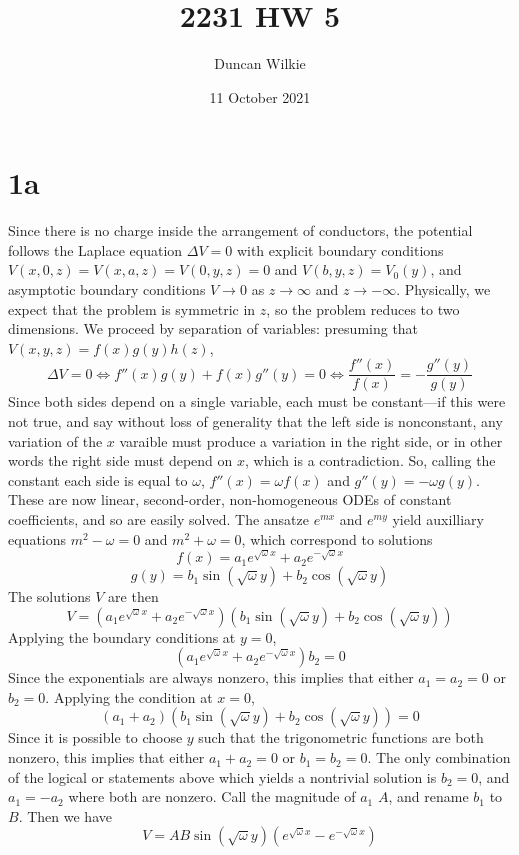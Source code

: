 \documentclass{article}
\title{2231 HW 5}
\author{Duncan Wilkie}
\date{11 October 2021}
\begin{document}
\maketitle

\section*{1a}
Since there is no charge inside the arrangement of conductors, the potential follows the Laplace equation $\Delta V=0$ with explicit boundary conditions $V(x,0,z)=V(x,a,z)=V(0,y,z)=0$ and $V(b,y,z)=V_0(y)$, and asymptotic boundary conditions $V\to 0$ as $z\to\infty$ and $z\to-\infty$. Physically, we expect that the problem is symmetric in $z$, so the problem reduces to two dimensions. We proceed by separation of variables: presuming that $V(x,y,z)=f(x)g(y)h(z)$, \[\Delta V=0\Leftrightarrow f''(x)g(y)+f(x)g''(y)=0\Leftrightarrow\frac{f''(x)}{f(x)}=-\frac{g''(y)}{g(y)}\]
Since both sides depend on a single variable, each must be constant---if this were not true, and say without loss of generality that the left side is nonconstant, any variation of the $x$ varaible must produce a variation in the right side, or in other words the right side must depend on $x$, which is a contradiction. So, calling the constant each side is equal to $\omega$, $f''(x)=\omega f(x)$ and $g''(y)=-\omega g(y)$. These are now linear, second-order, non-homogeneous ODEs of constant coefficients, and so are easily solved. The ansatze $e^{mx}$ and $e^{my}$ yield auxilliary equations $m^2-\omega=0$ and $m^2+\omega=0$, which correspond to solutions
\[f(x)=a_1e^{\sqrt{\omega}x}+a_2e^{-\sqrt{\omega}x}\]
\[g(y)=b_1\sin(\sqrt{\omega}y)+b_2\cos(\sqrt{\omega}y)\]
The solutions $V$ are then
\[V=\left( a_1e^{\sqrt{\omega}x}+a_2e^{-\sqrt{\omega}x} \right)\left( b_1\sin(\sqrt{\omega}y)+b_2\cos(\sqrt{\omega}y) \right)\]
Applying the boundary conditions at $y=0$,
\[\left( a_1e^{\sqrt{\omega}x}+a_2e^{-\sqrt{\omega}x} \right)b_2=0\]
Since the exponentials are always nonzero, this implies that either $a_1=a_2=0$ or $b_2=0$.
Applying the condition at $x=0$,
\[\left( a_1+a_2 \right)(b_1\sin(\sqrt{\omega}y)+b_2\cos(\sqrt{\omega}y))=0\]
Since it is possible to choose $y$ such that the trigonometric functions are both nonzero, this implies that either $a_1+a_2=0$ or $b_1=b_2=0$.
The only combination of the logical or statements above which yields a nontrivial solution is $b_2=0$, and $a_1=-a_2$ where both are nonzero. Call the magnitude of $a_1$ $A$, and rename $b_1$ to $B$. Then we have
\[V=AB\sin(\sqrt{\omega}y)\left(e^{\sqrt{\omega}x}-e^{-\sqrt{\omega}x}  \right)\]
\end{document}
